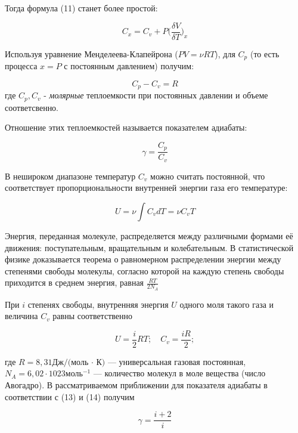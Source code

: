 \documentclass[10pt]{article}
\begin{document}
    Тогда формула (11) станет более простой:

    \begin{equation}
        C_x = C_v + P \bigg(\frac{\delta V}{\delta T}\bigg)_x
    \end{equation}

    Используя уравнение Менделеева-Клапейрона ($PV = \nu RT$),
    для $C_p$ (то есть процесса $x = P$ с постоянным давлением) получим:

    \begin{equation}
        C_p - C_v = R
    \end{equation}
    где $C_p, C_v$ - \textit{молярные} теплоемкости при постоянных давлении и объеме соответсвенно.

    Отношение этих теплоемкостей называется показателем адиабаты:

    \begin{equation}
        \gamma = \frac{C_p}{C_v}
    \end{equation}

    В нешироком диапазоне температур $C_v$ можно считать постоянной, что соответствует пропорциональности внутренней энергии газа его температуре:

    \begin{equation}
        U = \nu \int C_v dT = \nu C_v T
    \end{equation}

    Энергия, переданная молекуле, распределяется между различными формами её движения: поступательным, вращательным и колебательным. В статистической физике доказывается теорема о равномерном распределении энергии между степенями свободы молекулы, согласно которой на каждую степень свободы приходится в среднем энергия, равная $\frac{RT}{2 N_A}$

    При $i$ степенях свободы, внутренняя энергия $U$ одного моля такого газа и величина $C_v$ равны соответственно

    \begin{equation}
        U = \frac{i}{2}RT; \quad C_v = \frac{iR}{2}; 
    \end{equation}

    где $R = 8,31 \text{Дж}/\text{(моль · К)}$ — универсальная газовая постоянная, $N_A = 6,02 · 1023 \text{моль}^{−1}$ — количество молекул в моле вещества (число Авогадро).
    В рассматриваемом приближении для показателя адиабаты в соответствии с (13) и (14) получим

    \begin{equation}
        \gamma = \frac{i+2}{i}
    \end{equation}
\end{document}
